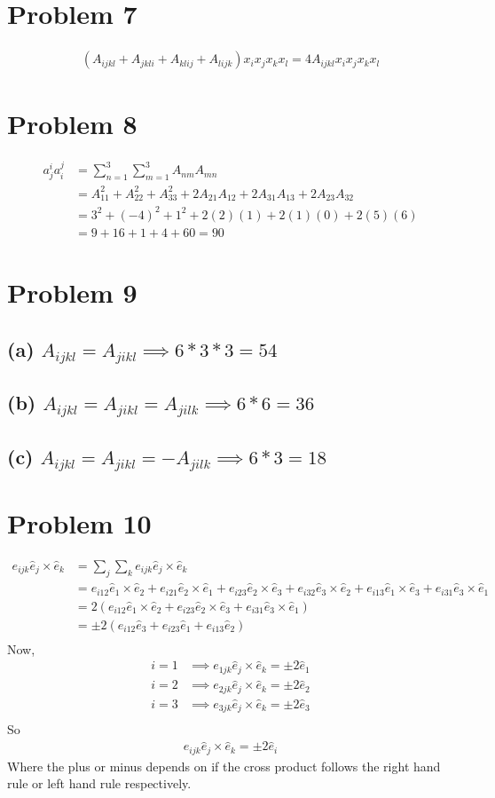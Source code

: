\documentclass[12pt]{article}
\newcommand{\eq}[1]{\begin{align*}#1\end{align*}}
\begin{document}
\section*{Problem 7}
\eq{
	(A_{ijkl} + A_{jkli} + A_{klij} + A_{lijk})x_ix_jx_kx_l = 4A_{ijkl}x_ix_jx_kx_l
}
\section*{Problem 8}
\eq{
	a_j^ia_i^j &= \sum_{n=1}^3\sum_{m=1}^3 A_{nm}A_{mn}\\
	&= A_{11}^2 + A_{22}^2 + A_{33}^2 + 2A_{21}A_{12} + 2A_{31}A_{13} + 2A_{23}A_{32}\\
	&= 3^2 + (-4)^2 + 1^2 + 2(2)(1) + 2(1)(0) + 2(5)(6)\\
	&= 9 + 16 + 1 + 4 + 60 = 90
}
\section*{Problem 9}
\subsection*{(a) $A_{ijkl} = A_{jikl} \implies 6*3*3 = 54$}
\subsection*{(b) $A_{ijkl} = A_{jikl} = A_{jilk} \implies 6*6 = 36$}
\subsection*{(c) $A_{ijkl} = A_{jikl} = -A_{jilk} \implies 6*3 = 18$}
\section*{Problem 10}
\eq{
	e_{ijk}\hat{e}_j \times \hat{e}_k &= \sum_j\sum_k e_{ijk}\hat{e}_j\times\hat{e}_k \\
	&= e_{i12}\hat{e}_1\times\hat{e}_2 + e_{i21}\hat{e}_2 \times \hat{e}_1 + e_{i23}\hat{e}_2\times\hat{e}_3 + e_{i32}\hat{e}_3 \times \hat{e}_2 + e_{i13}\hat{e}_1 \times \hat{e}_3 + e_{i31}\hat{e}_3\times\hat{e}_1\\
	&= 2\left(e_{i12}\hat{e}_1 \times \hat{e}_2 + e_{i23}\hat{e}_2 \times \hat{e}_3 + e_{i31}\hat{e}_3 \times \hat{e}_1\right)\\
	&= \pm2\left(e_{i12}\hat{e}_3 + e_{i23}\hat{e}_1 + e_{i13}\hat{e}_2\right)\\
}
Now,
\eq{
	i = 1 &\implies e_{1jk}\hat{e}_j\times\hat{e}_k = \pm2\hat{e}_1\\
	i = 2 &\implies e_{2jk}\hat{e}_j\times\hat{e}_k = \pm2\hat{e}_2\\
	i = 3 &\implies e_{3jk}\hat{e}_j\times\hat{e}_k = \pm2\hat{e}_3\\
}
So
\eq{
	e_{ijk}\hat{e}_j\times\hat{e}_k = \pm2\hat{e}_i
}
Where the plus or minus depends on if the cross product follows the right hand rule or left hand rule respectively.
\end{document}
